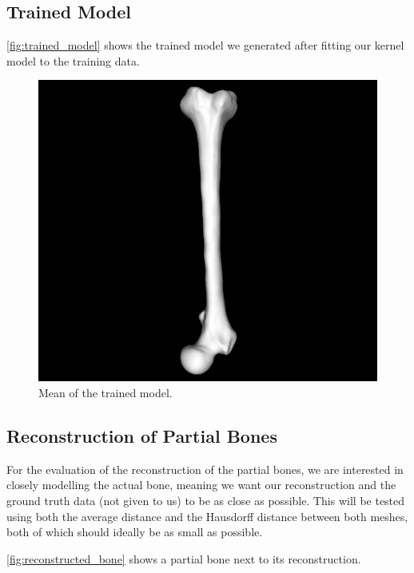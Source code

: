 
\subsection{Trained Model}
\label{subsec:trainedmodel}
\autoref{fig:trained_model} shows the trained model we generated after fitting our kernel model to the training data.

\begin{figure}
	\centering
  \includegraphics[scale=0.7]{./Figures/trained_model}
  \caption{Mean of the trained model.}
  \label{fig:trained_model}
\end{figure}


\subsection{Reconstruction of Partial Bones}
\label{subsec:reconresults}
For the evaluation of the reconstruction of the partial bones, we are interested in closely modelling the actual bone, meaning we want our reconstruction and the ground truth data (not given to us) to be as close as possible. 
This will be tested using both the average distance and the Hausdorff distance between both meshes, both of which should ideally be as small as possible.

\autoref{fig:reconstructed_bone} shows a partial bone next to its reconstruction.


